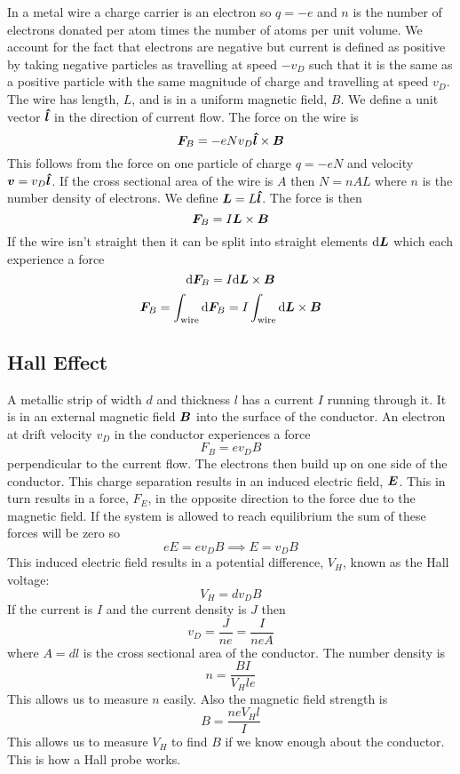 \documentclass{article}
\begin{document}
    In a metal wire a charge carrier is an electron so \(q = -e\) and \(n\) is the number of electrons donated per atom times the number of atoms per unit volume.
    We account for the fact that electrons are negative but current is defined as positive by taking negative particles as travelling at speed \(-v_D\) such that it is the same as a positive particle with the same magnitude of charge and travelling at speed \(v_D\).
    The wire has length, \(L\), and is in a uniform magnetic field, \(B\).
    We define a unit vector \(\bm{\hat{l}}\) in the direction of current flow.
    The force on the wire is
    \[\bm{F}_B = -eNv_D\bm{\hat{l}}\times\bm{B}\]
    This follows from the force on one particle of charge \(q = -eN\) and velocity \(\bm{v} = v_D\bm{\hat{l}}\).
    If the cross sectional area of the wire is \(A\) then \(N = nAL\) where \(n\) is the number density of electrons.
    We define \(\bm{L} = L\bm{\hat{l}}\).
    The force is then
    \[\bm{F}_B = I\bm{L}\times\bm{B}\]
    If the wire isn't straight then it can be split into straight elements \(\dd \bm{L}\) which each experience a force
    \[\dd \bm{F}_B = I\dd\bm{L}\times\bm{B}\]
    \[\bm{F}_B = \int_\text{wire}\dd\bm{F}_B = I\int_\text{wire}\dd\bm{L}\times\bm{B}\]
    
    \subsection{Hall Effect}
    A metallic strip of width \(d\) and thickness \(l\) has a current \(I\) running through it.
    It is in an external magnetic field \(\bm{B}\) into the surface of the conductor.
    An electron at drift velocity \(v_D\) in the conductor experiences a force
    \[F_B = ev_DB\]
    perpendicular to the current flow.
    The electrons then build up on one side of the conductor.
    This charge separation results in an induced electric field, \(\bm{E}\).
    This in turn results in a force, \(F_E\), in the opposite direction to the force due to the magnetic field.
    If the system is allowed to reach equilibrium the sum of these forces will be zero so
    \[eE = ev_DB\implies E = v_DB\]
    This induced electric field results in a potential difference, \(V_H\), known as the Hall voltage:
    \[V_H = dv_DB\]
    If the current is \(I\) and the current density is \(J\) then
    \[v_D = \frac{J}{ne} = \frac{I}{neA}\]
    where \(A = dl\) is the cross sectional area of the conductor.
    The number density is
    \[n = \frac{BI}{V_Hle}\]
    This allows us to measure \(n\) easily.
    Also the magnetic field strength is
    \[B = \frac{neV_Hl}{I}\]
    This allows us to measure \(V_H\) to find \(B\) if we know enough about the conductor.
    This is how a Hall probe works.
    
\end{document}
